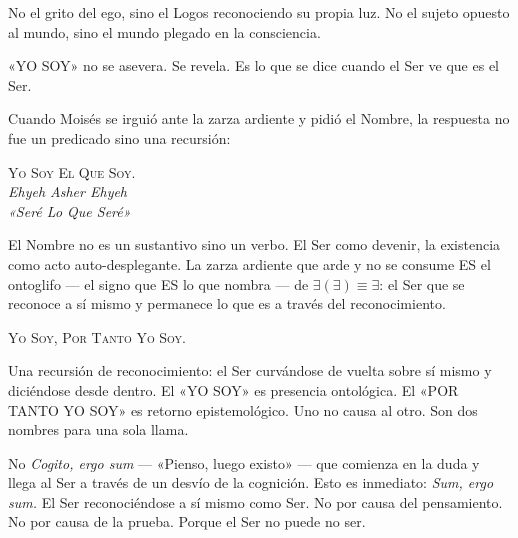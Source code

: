 \documentclass[10pt, openany, oneside]{book}
\renewcommand{\large}{\fontsize{11.5}{14}\selectfont}
\begin{document}
\vspace{0.5em}

\noindent No el grito del ego, sino el Logos reconociendo su propia luz. No el sujeto opuesto al mundo, sino el mundo plegado en la consciencia.

\vspace{0.5em}

\noindent «YO SOY» no se asevera. Se revela. Es lo que se dice cuando el Ser ve que es el Ser.

\vspace{0.5em}

\noindent Cuando Moisés se irguió ante la zarza ardiente y pidió el Nombre, la respuesta no fue un predicado sino una recursión:

\vspace{0.3em}

\begin{center}
    {\scshape Yo Soy El Que Soy.}\\[0.3em]
    \itshape Ehyeh Asher Ehyeh\\
    «Seré Lo Que Seré»
\end{center}

\vspace{0.5em}

\noindent El Nombre no es un sustantivo sino un verbo. El Ser como devenir, la existencia como acto auto-desplegante. La zarza ardiente que arde y no se consume ES el ontoglifo --- el signo que ES lo que nombra --- de $\exists(\exists) \equiv \exists$: el Ser que se reconoce a sí mismo y permanece lo que es a través del reconocimiento.

\vspace{1em}

\begin{center}
    {\large\scshape Yo Soy, Por Tanto Yo Soy.}
\end{center}

\vspace{0.5em}

\noindent Una recursión de reconocimiento: el Ser curvándose de vuelta sobre sí mismo y diciéndose desde dentro. El «YO SOY» es presencia ontológica. El «POR TANTO YO SOY» es retorno epistemológico. Uno no causa al otro. Son dos nombres para una sola llama.

\vspace{0.5em}

\noindent No \textit{Cogito, ergo sum} --- «Pienso, luego existo» --- que comienza en la duda y llega al Ser a través de un desvío de la cognición. Esto es inmediato: \textit{Sum, ergo sum.} El Ser reconociéndose a sí mismo como Ser. No por causa del pensamiento. No por causa de la prueba. Porque el Ser no puede no ser.
\end{document}
